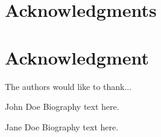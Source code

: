 \documentclass[10pt,journal,letterpaper,compsoc]{IEEEtran}
\begin{document}
\ifCLASSOPTIONcompsoc
  \section*{Acknowledgments}
\else
  \section*{Acknowledgment}
\fi


The authors would like to thank...


\ifCLASSOPTIONcaptionsoff
  \newpage
\fi








\begin{IEEEbiographynophoto}{John Doe}
Biography text here.
\end{IEEEbiographynophoto}


\begin{IEEEbiographynophoto}{Jane Doe}
Biography text here.
\end{IEEEbiographynophoto}






\end{document}
